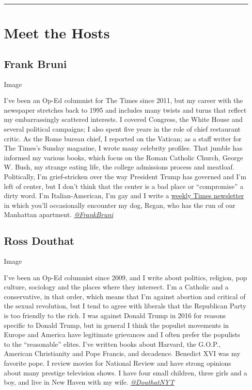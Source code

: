 \begin{center}\rule{0.5\linewidth}{\linethickness}\end{center}

\hypertarget{meet-the-hosts}{%
\section{Meet the Hosts}\label{meet-the-hosts}}

\hypertarget{frank-bruni}{%
\subsection{Frank Bruni}\label{frank-bruni}}

Image

I've been an Op-Ed columnist for The Times since 2011, but my career
with the newspaper stretches back to 1995 and includes many twists and
turns that reflect my embarrassingly scattered interests. I covered
Congress, the White House and several political campaigns; I also spent
five years in the role of chief restaurant critic. As the Rome bureau
chief, I reported on the Vatican; as a staff writer for The Times's
Sunday magazine, I wrote many celebrity profiles. That jumble has
informed my various books, which focus on the Roman Catholic Church,
George W. Bush, my strange eating life, the college admissions process
and meatloaf. Politically, I'm grief-stricken over the way President
Trump has governed and I'm left of center, but I don't think that the
center is a bad place or ``compromise'' a dirty word. I'm
Italian-American, I'm gay and I write a
\href{https://www.nytimes3xbfgragh.onion/newsletters/frank-bruni}{weekly
Times newsletter} in which you'll occasionally encounter my dog, Regan,
who has the run of our Manhattan apartment.
\href{https://twitter.com/FrankBruni}{\emph{@FrankBruni}}

\hypertarget{ross-douthat}{%
\subsection{Ross Douthat}\label{ross-douthat}}

Image

I've been an Op-Ed columnist since 2009, and I write about politics,
religion, pop culture, sociology and the places where they intersect.
I'm a Catholic and a conservative, in that order, which means that I'm
against abortion and critical of the sexual revolution, but I tend to
agree with liberals that the Republican Party is too friendly to the
rich. I was against Donald Trump in 2016 for reasons specific to Donald
Trump, but in general I think the populist movements in Europe and
America have legitimate grievances and I often prefer the populists to
the ``reasonable'' elites. I've written books about Harvard, the G.O.P.,
American Christianity and Pope Francis, and decadence. Benedict XVI was
my favorite pope. I review movies for National Review and have strong
opinions about many prestige television shows. I have four small
children, three girls and a boy, and live in New Haven with my wife.
\href{https://twitter.com/DouthatNYT}{\emph{@DouthatNYT}}

